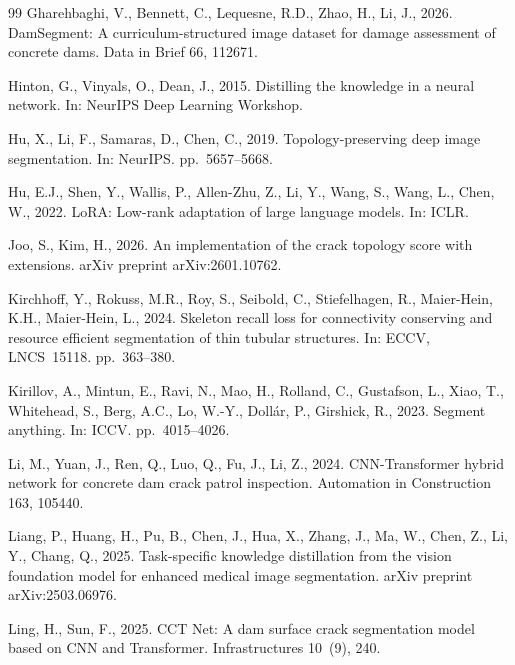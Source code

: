 \documentclass[review,authoryear]{elsarticle}
\begin{document}
\begin{thebibliography}{99}
Gharehbaghi, V., Bennett, C., Lequesne, R.D., Zhao, H., Li, J., 2026.
\newblock DamSegment: A curriculum-structured image dataset for damage assessment of concrete dams.
\newblock Data in Brief 66, 112671.

Hinton, G., Vinyals, O., Dean, J., 2015.
\newblock Distilling the knowledge in a neural network.
\newblock In: NeurIPS Deep Learning Workshop.

Hu, X., Li, F., Samaras, D., Chen, C., 2019.
\newblock Topology-preserving deep image segmentation.
\newblock In: NeurIPS. pp.~5657--5668.

Hu, E.J., Shen, Y., Wallis, P., Allen-Zhu, Z., Li, Y., Wang, S., Wang, L., Chen, W., 2022.
\newblock LoRA: Low-rank adaptation of large language models.
\newblock In: ICLR.

Joo, S., Kim, H., 2026.
\newblock An implementation of the crack topology score with extensions.
\newblock arXiv preprint arXiv:2601.10762.

Kirchhoff, Y., Rokuss, M.R., Roy, S., Seibold, C., Stiefelhagen, R., Maier-Hein, K.H., Maier-Hein, L., 2024.
\newblock Skeleton recall loss for connectivity conserving and resource efficient segmentation of thin tubular structures.
\newblock In: ECCV, LNCS~15118. pp.~363--380.

Kirillov, A., Mintun, E., Ravi, N., Mao, H., Rolland, C., Gustafson, L., Xiao, T., Whitehead, S., Berg, A.C., Lo, W.-Y., Doll\'{a}r, P., Girshick, R., 2023.
\newblock Segment anything.
\newblock In: ICCV. pp.~4015--4026.

Li, M., Yuan, J., Ren, Q., Luo, Q., Fu, J., Li, Z., 2024.
\newblock CNN-Transformer hybrid network for concrete dam crack patrol inspection.
\newblock Automation in Construction 163, 105440.

Liang, P., Huang, H., Pu, B., Chen, J., Hua, X., Zhang, J., Ma, W., Chen, Z., Li, Y., Chang, Q., 2025.
\newblock Task-specific knowledge distillation from the vision foundation model for enhanced medical image segmentation.
\newblock arXiv preprint arXiv:2503.06976.

Ling, H., Sun, F., 2025.
\newblock CCT Net: A dam surface crack segmentation model based on CNN and Transformer.
\newblock Infrastructures 10~(9), 240.


\end{thebibliography}
\end{document}
